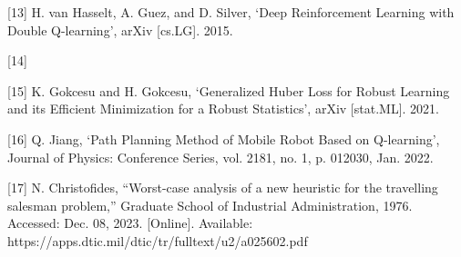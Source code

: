 \documentclass{article}
\begin{document}
	[13] H. van Hasselt, A. Guez, and D. Silver, ‘Deep Reinforcement Learning with Double Q-learning’, arXiv [cs.LG]. 2015.
	
	[14] 
	
	[15] K. Gokcesu and H. Gokcesu, ‘Generalized Huber Loss for Robust Learning and its Efficient Minimization for a Robust Statistics’, arXiv [stat.ML]. 2021.
	
	[16] Q. Jiang, ‘Path Planning Method of Mobile Robot Based on Q-learning’, Journal of Physics: Conference Series, vol. 2181, no. 1, p. 012030, Jan. 2022.
	
	[17] N. Christofides, “Worst-case analysis of a new heuristic for the travelling salesman problem,” Graduate School of Industrial Administration, 1976. Accessed: Dec. 08, 2023. [Online]. Available: https://apps.dtic.mil/dtic/tr/fulltext/u2/a025602.pdf
	
\end{document}
